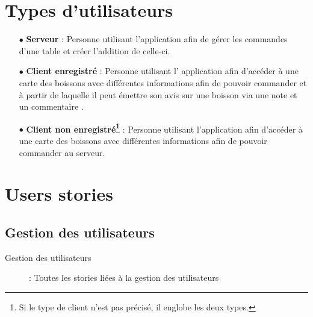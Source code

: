 

\section{Types d'utilisateurs}
\begin{itemize}
	\item[{$\bullet$}] \textbf{Serveur} : Personne utilisant l'application
	afin de gérer les commandes d'une table et créer l'addition de celle-ci.
	\item[{$\bullet$}] \textbf{Client enregistré} : Personne utilisant l'
	application afin d'accéder à une carte des boissons avec différentes 
	informations afin de pouvoir commander et à partir de laquelle il peut
	émettre son avis sur une boisson via une note et un commentaire .
	\item[{$\bullet$}] \textbf{Client non enregistré\footnote{Si le type
	de client n'est pas précisé, il englobe les deux types.}} : Personne
	utilisant l'application afin d'accéder à une carte des boissons avec
	différentes informations afin de pouvoir commander au serveur.
\end{itemize}

\section{Users stories}
\subsection{Gestion des utilisateurs}

\begin{description}
	\item[Gestion des utilisateurs] : Toutes les stories liées à la gestion des utilisateurs
\end{description}

